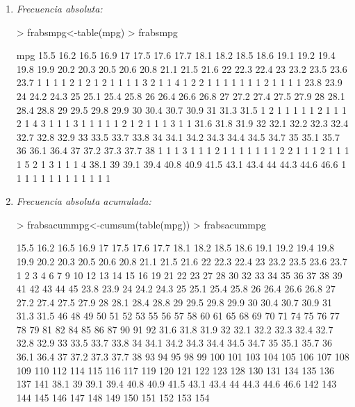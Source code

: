 \documentclass [a4paper] {article}
\begin{document}
\begin{enumerate}
\item
\textit{Frecuencia absoluta: }
\begin{Schunk}
\begin{Sinput}
> frabsmpg<-table(mpg)
> frabsmpg
\end{Sinput}
\begin{Soutput}
mpg
15.5 16.2 16.5 16.9   17 17.5 17.6 17.7 18.1 18.2 18.5 18.6 19.1 19.2 19.4 19.8 19.9 20.2 20.3 20.5 20.6 20.8 21.1 21.5 21.6   22 22.3 22.4   23 23.2 23.5 23.6 23.7 
   1    1    1    1    2    1    2    1    2    1    1    1    1    3    2    1    1    4    1    2    2    1    1    1    1    1    1    1    2    1    1    1    1 
23.8 23.9   24 24.2 24.3   25 25.1 25.4 25.8   26 26.4 26.6 26.8   27 27.2 27.4 27.5 27.9   28 28.1 28.4 28.8   29 29.5 29.8 29.9   30 30.4 30.7 30.9   31 31.3 31.5 
   1    2    1    1    1    1    1    2    1    1    1    2    1    4    3    1    1    1    3    1    1    1    1    1    2    1    2    1    1    1    3    1    1 
31.6 31.8 31.9   32 32.1 32.2 32.3 32.4 32.7 32.8 32.9   33 33.5 33.7 33.8   34 34.1 34.2 34.3 34.4 34.5 34.7   35 35.1 35.7   36 36.1 36.4   37 37.2 37.3 37.7   38 
   1    1    1    3    1    1    1    2    1    1    1    1    1    1    1    2    2    1    1    1    2    1    1    1    1    5    2    1    3    1    1    1    4 
38.1   39 39.1 39.4 40.8 40.9 41.5 43.1 43.4   44 44.3 44.6 46.6 
   1    1    1    1    1    1    1    1    1    1    1    1    1 
\end{Soutput}
\end{Schunk}

\item
\textit{Frecuencia absoluta acumulada: }
\begin{Schunk}
\begin{Sinput}
> frabsacummpg<-cumsum(table(mpg))
> frabsacummpg
\end{Sinput}
\begin{Soutput}
15.5 16.2 16.5 16.9   17 17.5 17.6 17.7 18.1 18.2 18.5 18.6 19.1 19.2 19.4 19.8 19.9 20.2 20.3 20.5 20.6 20.8 21.1 21.5 21.6   22 22.3 22.4   23 23.2 23.5 23.6 23.7 
   1    2    3    4    6    7    9   10   12   13   14   15   16   19   21   22   23   27   28   30   32   33   34   35   36   37   38   39   41   42   43   44   45 
23.8 23.9   24 24.2 24.3   25 25.1 25.4 25.8   26 26.4 26.6 26.8   27 27.2 27.4 27.5 27.9   28 28.1 28.4 28.8   29 29.5 29.8 29.9   30 30.4 30.7 30.9   31 31.3 31.5 
  46   48   49   50   51   52   53   55   56   57   58   60   61   65   68   69   70   71   74   75   76   77   78   79   81   82   84   85   86   87   90   91   92 
31.6 31.8 31.9   32 32.1 32.2 32.3 32.4 32.7 32.8 32.9   33 33.5 33.7 33.8   34 34.1 34.2 34.3 34.4 34.5 34.7   35 35.1 35.7   36 36.1 36.4   37 37.2 37.3 37.7   38 
  93   94   95   98   99  100  101  103  104  105  106  107  108  109  110  112  114  115  116  117  119  120  121  122  123  128  130  131  134  135  136  137  141 
38.1   39 39.1 39.4 40.8 40.9 41.5 43.1 43.4   44 44.3 44.6 46.6 
 142  143  144  145  146  147  148  149  150  151  152  153  154 
\end{Soutput}
\end{Schunk}


\end{enumerate}
\end{document}
